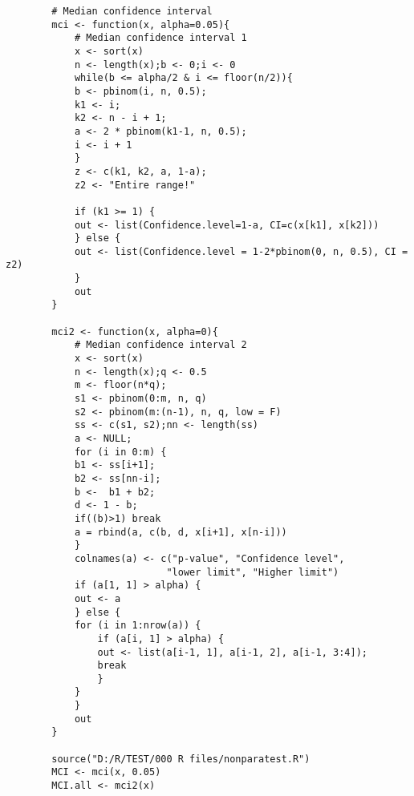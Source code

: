 \documentclass[UTF8]{ctexart}
\numberwithin{equation}{section}
\begin{document}
\begin{center}
    \begin{lstlisting}
        # Median confidence interval
        mci <- function(x, alpha=0.05){
            # Median confidence interval 1
            x <- sort(x)
            n <- length(x);b <- 0;i <- 0
            while(b <= alpha/2 & i <= floor(n/2)){
            b <- pbinom(i, n, 0.5);
            k1 <- i;
            k2 <- n - i + 1;
            a <- 2 * pbinom(k1-1, n, 0.5);
            i <- i + 1
            }
            z <- c(k1, k2, a, 1-a);
            z2 <- "Entire range!"
            
            if (k1 >= 1) {
            out <- list(Confidence.level=1-a, CI=c(x[k1], x[k2]))
            } else {
            out <- list(Confidence.level = 1-2*pbinom(0, n, 0.5), CI = z2)
            }
            out
        }
        
        mci2 <- function(x, alpha=0){
            # Median confidence interval 2
            x <- sort(x)
            n <- length(x);q <- 0.5
            m <- floor(n*q);
            s1 <- pbinom(0:m, n, q)
            s2 <- pbinom(m:(n-1), n, q, low = F)
            ss <- c(s1, s2);nn <- length(ss)
            a <- NULL;
            for (i in 0:m) {
            b1 <- ss[i+1];
            b2 <- ss[nn-i];
            b <-  b1 + b2;
            d <- 1 - b;
            if((b)>1) break
            a = rbind(a, c(b, d, x[i+1], x[n-i]))
            }
            colnames(a) <- c("p-value", "Confidence level", 
                            "lower limit", "Higher limit")
            if (a[1, 1] > alpha) {
            out <- a
            } else {
            for (i in 1:nrow(a)) {
                if (a[i, 1] > alpha) {
                out <- list(a[i-1, 1], a[i-1, 2], a[i-1, 3:4]);
                break
                }
            }
            }
            out
        }
        
        source("D:/R/TEST/000 R files/nonparatest.R")
        MCI <- mci(x, 0.05)
        MCI.all <- mci2(x)
    \end{lstlisting}
\end{center}
\end{document}

